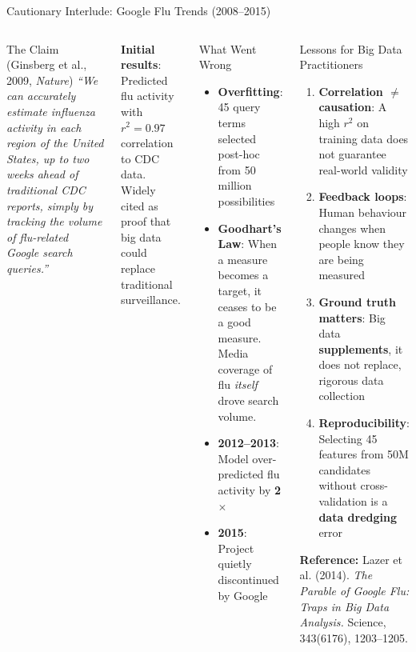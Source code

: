 \documentclass[aspectratio=169,10pt]{beamer}
\begin{document}
\begin{frame}{Cautionary Interlude: Google Flu Trends (2008--2015)}
  \begin{columns}[T]
      \begin{block}{The Claim (Ginsberg et al., 2009, \textit{Nature})}
        \textit{``We can accurately estimate influenza activity in each region of the United States, up to two weeks ahead of traditional CDC reports, simply by tracking the volume of flu-related Google search queries.''}
      \end{block}
      \vspace{6pt}
      \textbf{Initial results}: Predicted flu activity with $r^2 = 0.97$ correlation to CDC data.  Widely cited as proof that big data could replace traditional surveillance.
      \vspace{6pt}
      \begin{alertblock}{What Went Wrong}
        \begin{itemize}
          \item \textbf{Overfitting}: 45 query terms selected post-hoc from 50 million possibilities
          \item \textbf{Goodhart's Law}: When a measure becomes a target, it ceases to be a good measure.  Media coverage of flu \emph{itself} drove search volume.
          \item \textbf{2012--2013}: Model over-predicted flu activity by \textbf{2$\times$}
          \item \textbf{2015}: Project quietly discontinued by Google
        \end{itemize}
      \end{alertblock}

      \begin{exampleblock}{Lessons for Big Data Practitioners}
        \begin{enumerate}
          \item \textbf{Correlation $\neq$ causation}: A high $r^2$ on training data does not guarantee real-world validity
          \item \textbf{Feedback loops}: Human behaviour changes when people know they are being measured
          \item \textbf{Ground truth matters}: Big data \textbf{supplements}, it does not replace, rigorous data collection
          \item \textbf{Reproducibility}: Selecting 45 features from 50M candidates without cross-validation is a \textbf{data dredging} error
        \end{enumerate}
        \vspace{4pt}
        \textbf{Reference:} Lazer et al. (2014). \textit{The Parable of Google Flu: Traps in Big Data Analysis.} Science, 343(6176), 1203--1205.
      \end{exampleblock}
  \end{columns}
\end{frame}
\end{document}
